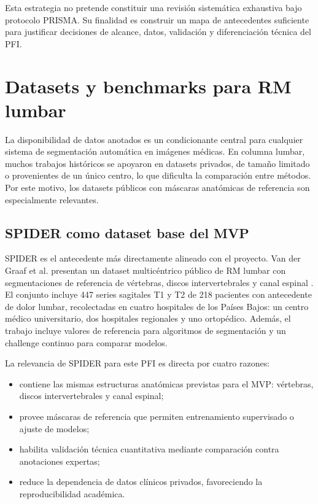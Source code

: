 Esta estrategia no pretende constituir una revisión sistemática exhaustiva bajo protocolo PRISMA. Su finalidad es construir un mapa de antecedentes suficiente para justificar decisiones de alcance, datos, validación y diferenciación técnica del PFI.

\section{Datasets y benchmarks para RM lumbar}

La disponibilidad de datos anotados es un condicionante central para cualquier sistema de segmentación automática en imágenes médicas. En columna lumbar, muchos trabajos históricos se apoyaron en datasets privados, de tamaño limitado o provenientes de un único centro, lo que dificulta la comparación entre métodos. Por este motivo, los datasets públicos con máscaras anatómicas de referencia son especialmente relevantes.

\subsection{SPIDER como dataset base del MVP}

SPIDER es el antecedente más directamente alineado con el proyecto. Van der Graaf et al. presentan un dataset multicéntrico público de RM lumbar con segmentaciones de referencia de vértebras, discos intervertebrales y canal espinal \parencite{vandergraaf_spider_2024}. El conjunto incluye 447 series sagitales T1 y T2 de 218 pacientes con antecedente de dolor lumbar, recolectadas en cuatro hospitales de los Países Bajos: un centro médico universitario, dos hospitales regionales y uno ortopédico. Además, el trabajo incluye valores de referencia para algoritmos de segmentación y un challenge continuo para comparar modelos.

La relevancia de SPIDER para este PFI es directa por cuatro razones:

\begin{itemize}
    \item contiene las mismas estructuras anatómicas previstas para el MVP: vértebras, discos intervertebrales y canal espinal;
    \item provee máscaras de referencia que permiten entrenamiento supervisado o ajuste de modelos;
    \item habilita validación técnica cuantitativa mediante comparación contra anotaciones expertas;
    \item reduce la dependencia de datos clínicos privados, favoreciendo la reproducibilidad académica.
\end{itemize}

